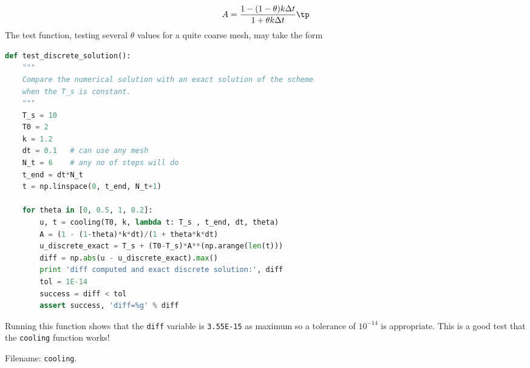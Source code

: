 \documentclass[graybox,sectrefs,envcountresetchap,open=right,final]{svmonodo}
\newenvironment{doconceexercise}{}{}
\begin{document}
\begin{doconceexercise}
\[ A = \frac{1 - (1-\theta) k\Delta t}{1 + \theta k\Delta t}\tp\]
The test function, testing several $\theta$ values for a quite coarse
mesh, may take the form

\begin{lstlisting}[language=Python,style=blue1_bluegreen]
def test_discrete_solution():
    """
    Compare the numerical solution with an exact solution of the scheme
    when the T_s is constant.
    """
    T_s = 10
    T0 = 2
    k = 1.2
    dt = 0.1   # can use any mesh
    N_t = 6    # any no of steps will do
    t_end = dt*N_t
    t = np.linspace(0, t_end, N_t+1)

    for theta in [0, 0.5, 1, 0.2]:
        u, t = cooling(T0, k, lambda t: T_s , t_end, dt, theta)
        A = (1 - (1-theta)*k*dt)/(1 + theta*k*dt)
        u_discrete_exact = T_s + (T0-T_s)*A**(np.arange(len(t)))
        diff = np.abs(u - u_discrete_exact).max()
        print 'diff computed and exact discrete solution:', diff
        tol = 1E-14
        success = diff < tol
        assert success, 'diff=%g' % diff
\end{lstlisting}
Running this function shows that the \texttt{diff} variable is \texttt{3.55E-15}
as maximum so a tolerance of $10^{-14}$ is appropriate.
This is a good test that the \texttt{cooling} function works!


\noindent Filename: \texttt{cooling}.

\end{doconceexercise}
\end{document}

